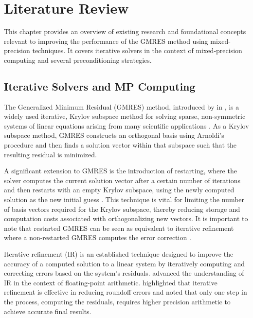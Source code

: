 \chapter{Literature Review}
\label{cha:literature-review}

This chapter provides an overview of existing research and foundational concepts
relevant to improving the performance of the GMRES method using mixed-precision
techniques. It covers iterative solvers in the context of mixed-precision
computing and several preconditioning strategies.

\section{Iterative Solvers and MP Computing}
\label{sec:iterative-solvers}

The Generalized Minimum Residual (GMRES) method, introduced by
\citeauthor{saad_gmres_1986} in \citeyear{saad_gmres_1986}, is a widely used
iterative, Krylov subspace method for solving sparse, non-symmetric systems of
linear equations arising from many scientific applications
\cite{saad_gmres_1986}. As a Krylov subspace method, GMRES constructs an
orthogonal basis using Arnoldi’s procedure and then finds a solution vector
within that subspace such that the resulting residual is minimized.

A significant extension to GMRES is the introduction of restarting, where the
solver computes the current solution vector after a certain number of iterations
and then restarts with an empty Krylov subspace, using the newly computed
solution as the new initial guess \cite{lindquist_improving_2020}. This
technique is vital for limiting the number of basis vectors required for the
Krylov subspace, thereby reducing storage and computation costs associated with
orthogonalizing new vectors. It is important to note that restarted GMRES can be
seen as equivalent to iterative refinement where a non-restarted GMRES computes
the error correction \cite{lindquist_improving_2020,mary_mixed_2023}.

Iterative refinement (IR) is an established technique designed to improve the
accuracy of a computed solution to a linear system by iteratively computing and
correcting errors based on the system's residuals.
\textcite{moler_iterative_1967} advanced the understanding of IR in the context
of floating-point arithmetic. \citeauthor{moler_iterative_1967} highlighted that
iterative refinement is effective in reducing roundoff errors and noted that
only one step in the process, computing the residuals, requires higher precision
arithmetic to achieve accurate final results.


